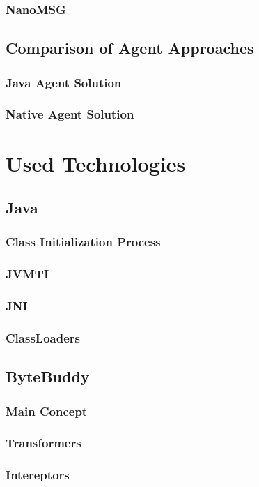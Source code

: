 \documentclass[12pt,a4paper]{report}
\begin{document}
\subsection{NanoMSG}

\section{Comparison of Agent Approaches}
\subsection{Java Agent Solution}
\subsection{Native Agent Solution}

\chapter{Used Technologies}
\section{Java}
\subsection{Class Initialization Process}
\subsection{JVMTI}
\subsection{JNI}
\subsection{ClassLoaders}
\section{ByteBuddy}
\subsection{Main Concept}
\subsection{Transformers}
\subsection{Intereptors}
\end{document}
